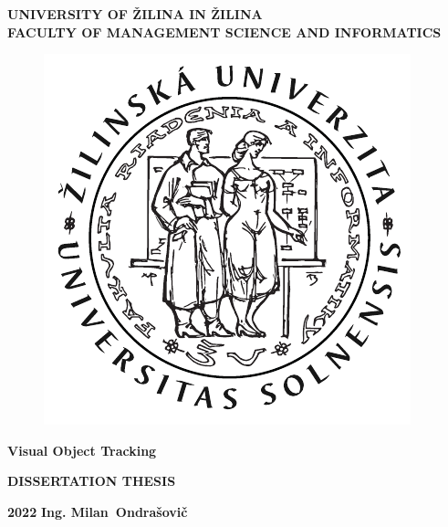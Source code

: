 \begin{titlepage}
    \begin{center}
        \vspace*{1cm} %

        \normalsize
        \textbf{UNIVERSITY OF ŽILINA IN ŽILINA}\\
        \textbf{FACULTY OF MANAGEMENT SCIENCE AND INFORMATICS}\\

        \begin{figure}[!h]
            \centerline{\includegraphics[width=0.25\linewidth]{figures/formal_pages/FRI_logo.pdf}}
        \end{figure}

        \vspace{5cm}

        \LARGE
        \textbf{Visual Object Tracking}

        \vspace{1cm}

        \Large
        \textbf{DISSERTATION THESIS}
    \end{center}

    \vspace{2cm}

    \vfill

    \normalsize

    \vspace{2cm}

    \textbf{2022} \hfill \textbf{Ing. Milan~Ondra\v{s}ovi\v{c}}

\end{titlepage}
